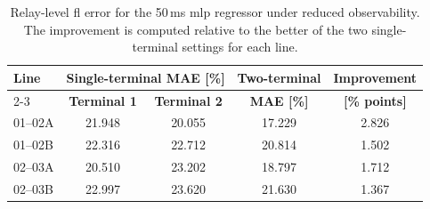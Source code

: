 \begin{table}[ht]
\centering
\small
\caption{Relay-level \ac{fl} error for the 50\,ms \ac{mlp} regressor under reduced observability. The improvement is computed relative to the better of the two single-terminal settings for each line.}
\label{tab:fl_observability_detail_mlp_50ms}
\begin{tabular}{lcccc}
\toprule
\textbf{Line} &
\multicolumn{2}{c}{\textbf{Single-terminal MAE [\%]}} &
\textbf{Two-terminal} &
\textbf{Improvement} \\
\cmidrule(lr){2-3}
& \textbf{Terminal 1} & \textbf{Terminal 2} & \textbf{MAE [\%]} & \textbf{[\% points]} \\
\midrule
01--02A & 21.948 & 20.055 & 17.229 & 2.826 \\
01--02B & 22.316 & 22.712 & 20.814 & 1.502 \\
02--03A & 20.510 & 23.202 & 18.797 & 1.712 \\
02--03B & 22.997 & 23.620 & 21.630 & 1.367 \\
\bottomrule
\end{tabular}
\end{table}
